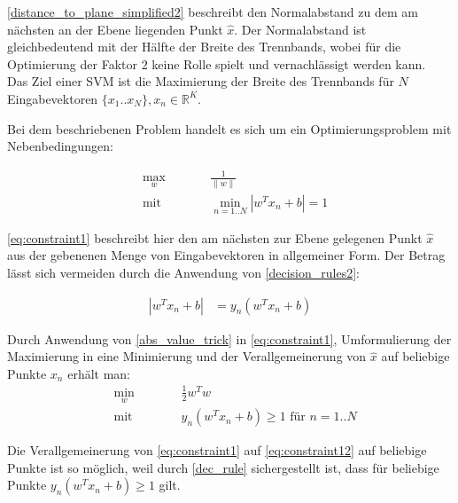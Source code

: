 \documentclass[a4paper,11pt,twoside]{scrreprt}
\newcommand{\norm}[1]{\lVert#1\rVert}
\begin{document}
\autoref{distance_to_plane_simplified2} beschreibt den Normalabstand zu dem am nächsten an der Ebene liegenden Punkt $\hat{x}$. Der Normalabstand ist gleichbedeutend mit der Hälfte der Breite des Trennbands, wobei für die Optimierung der Faktor $2$ keine Rolle spielt und vernachlässigt werden kann. \\
Das Ziel einer \ac{SVM} ist die Maximierung der Breite des Trennbands für $N$ Eingabevektoren $\{x_{1}..x_{N}\}, x_{n} \in \mathbb{R}^{K}$. 

Bei dem beschriebenen Problem handelt es sich um ein Optimierungsproblem mit Nebenbedingungen:

\begin{subequations}
	\begin{alignat}{2}
		&\!\max_{w}        &\qquad&  \frac{1}{\norm{w}} \label{eq:optProb}\\
		&\text{mit } &      & \min_{n=1..N} |w^{T} x_{n} + b| = 1 \label{eq:constraint1}
	\end{alignat}
\end{subequations}

\autoref{eq:constraint1} beschreibt hier den am nächsten zur Ebene gelegenen Punkt $\hat{x}$ aus der gebenenen Menge von Eingabevektoren in allgemeiner Form. Der Betrag lässt sich vermeiden durch die Anwendung von \autoref{decision_rules2}:

\begin{equation} \label{abs_value_trick}
	\begin{aligned}
		|w^{T} x_{n} + b| &= y_{n} (w^{T} x_{n} + b)
	\end{aligned}
\end{equation}


Durch Anwendung von \autoref{abs_value_trick} in \autoref{eq:constraint1}, Umformulierung der Maximierung in eine Minimierung und der Verallgemeinerung von $\hat{x}$ auf beliebige Punkte $x_{n}$ erhält man:
\begin{subequations}
	\begin{alignat}{2}
		&\!\min_{w}        &\qquad&  \frac{1}{2} w^{T} w \label{eq:optProb2}\\
		&\text{mit } &      & y_n (w^{T} x_{n} + b) \geq 1 \text{ für } n=1..N \label{eq:constraint12}
	\end{alignat}
\end{subequations}

Die Verallgemeinerung von \autoref{eq:constraint1} auf \autoref{eq:constraint12} auf beliebige Punkte ist so möglich, weil durch \autoref{dec_rule} sichergestellt ist, dass für beliebige Punkte $y_{n}(w^{T} x_{n} + b) \geq 1$ gilt.
\end{document}
